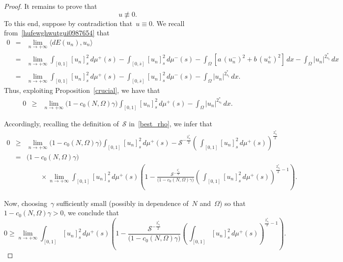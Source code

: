 \documentclass[12pt,a4paper,intlimits,sumlimits]{amsart}
\theoremstyle{definition}
\theoremstyle{plain}
\numberwithin{equation}{section}
\renewcommand{\ge}{\geqslant}
\begin{document}
\begin{proof}
It remains to prove that
\begin{equation}\label{uzerosper00}
u\not\equiv 0.\end{equation}
To this end,
suppose by contradiction that~$u\equiv 0$. 
We recall from~\eqref{hufewghwutgui0987654} that
\begin{eqnarray*} 0&=&
\lim_{n\to+\infty}\langle dE(u_n), u_n\rangle \\
&=&\lim_{n\to+\infty} \int_{[{{ 0 }}, 1]} [u_n]^2_{s}\, d\mu^+ (s) -\int_{[{{ 0 }}, \overline s]} [u_n]^2_s \, d\mu^-(s) - \int_\Omega \left[a\, (u_n^-)^2 + b\, (u_n^+)^2\right] \,dx - \int_\Omega |u_n|^{2_{s_\sharp}^\ast}\, dx \\&=&
\lim_{n\to+\infty} \int_{[{{ 0 }}, 1]} [u_n]^2_{s}\, d\mu^+ (s) -\int_{[{{ 0 }}, \overline s]} [u_n]^2_s \, d\mu^-(s) - \int_\Omega |u_n|^{2_{s_\sharp}^\ast}\, dx.
\end{eqnarray*}
Thus, exploiting Proposition~\ref{crucial}, we have that
\begin{eqnarray*} 0&\ge&
\lim_{n\to+\infty} \big(1-c_0(N,\Omega)\gamma\big)\int_{[{{ 0 }}, 1]} [u_n]^2_{s}\, d\mu^+ (s)  - \int_\Omega |u_n|^{2_{s_\sharp}^\ast}\, dx.
\end{eqnarray*}

Accordingly, recalling the definition of~${\mathcal{S}}$ in~\eqref{best_rho}, we infer that
\begin{eqnarray*}
0 &\ge& \lim_{n\to+\infty} 
\big(1-c_0(N,\Omega)\gamma\big)\int_{[{{ 0 }}, 1]} [u_n]^2_{s}\, d\mu^+ (s)
-\mathcal{S}^{-\frac{2_{s_\sharp}^*}2}
\left(\, \int_{[{{ 0 }}, 1]} [u_n]^2_{s}\, d\mu^+ (s)\right)^{\frac{2_{s_\sharp}^*}2}\\
&=&  \big(1-c_0(N,\Omega)\gamma\big)\\&&\qquad\times\lim_{n\to+\infty} 
\int_{[{{ 0 }}, 1]} [u_n]^2_{s}\, d\mu^+ (s) \left(1 - \frac{\mathcal{S}^{-\frac{2_{s_\sharp}^*}2}}{\big(1-c_0(N,\Omega)\gamma\big)}
\left(\, \int_{[{{ 0 }}, 1]} [u_n]^2_{s}\, d\mu^+ (s)\right)^{\frac{2_{s_\sharp}^*}2-1 }\right).
\end{eqnarray*}

Now, choosing~$\gamma$ sufficiently small (possibly in dependence of~$N$
and~$\Omega$) so that~$1-c_0(N,\Omega)\gamma>0$, we conclude that
\begin{equation}\label{jdiweogbfgsdkgjk00}
0\ge \lim_{n\to+\infty} \int_{[{{ 0 }}, 1]} [u_n]^2_{s}\, d\mu^+ (s)
\left(1 - \frac{\mathcal{S}^{-\frac{2_{s_\sharp}^*}2}}{\big(1-c_0(N,\Omega)\gamma\big)}
\left(\, \int_{[{{ 0 }}, 1]} [u_n]^2_{s}\, d\mu^+ (s)\right)^{\frac{2_{s_\sharp}^*}2-1 }\right).
\end{equation}


\end{proof}
\end{document}
